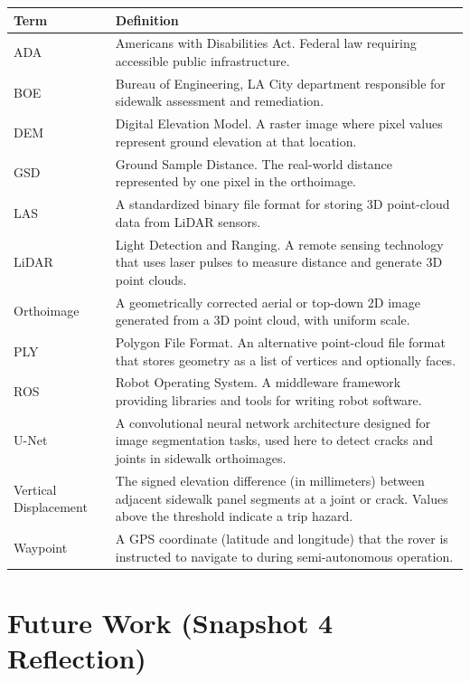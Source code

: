 \documentclass{article}
\begin{document}
\begin{longtable}{|p{1.5in}|p{5in}|}
\hline
\textbf{Term} & \textbf{Definition} \\
\hline
ADA & Americans with Disabilities Act. Federal law requiring accessible public
  infrastructure. \\
\hline
BOE & Bureau of Engineering, LA City department responsible for sidewalk
  assessment and remediation. \\
\hline
DEM & Digital Elevation Model. A raster image where pixel values represent
  ground elevation at that location. \\
\hline
GSD & Ground Sample Distance. The real-world distance represented by one pixel
  in the orthoimage. \\
\hline
LAS & A standardized binary file format for storing 3D point-cloud data from
  LiDAR sensors. \\
\hline
LiDAR & Light Detection and Ranging. A remote sensing technology that uses laser
  pulses to measure distance and generate 3D point clouds. \\
\hline
Orthoimage & A geometrically corrected aerial or top-down 2D image generated from a
  3D point cloud, with uniform scale. \\
\hline
PLY & Polygon File Format. An alternative point-cloud file format that stores
  geometry as a list of vertices and optionally faces. \\
\hline
ROS & Robot Operating System. A middleware framework providing libraries and tools
  for writing robot software. \\
\hline
U-Net & A convolutional neural network architecture designed for image segmentation
  tasks, used here to detect cracks and joints in sidewalk orthoimages. \\
\hline
Vertical Displacement & The signed elevation difference (in millimeters) between adjacent
  sidewalk panel segments at a joint or crack. Values above the threshold indicate
  a trip hazard. \\
\hline
Waypoint & A GPS coordinate (latitude and longitude) that the rover is instructed to
  navigate to during semi-autonomous operation. \\
\hline
\end{longtable}


\section{Future Work (Snapshot 4 Reflection)}
\end{document}
